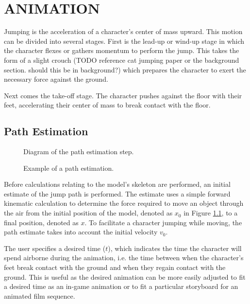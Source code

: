  
\chapter{ANIMATION}
\label{chapter:animation}

Jumping is the acceleration of a character's center of mass upward.  This motion can be divided into several stages.  First is the lead-up or wind-up stage in which the character flexes or gathers momentum to perform the jump.  This takes the form of a slight crouch (TODO reference cat jumping paper or the background section.  should this be in background?) which prepares the character to exert the necessary force against the ground.  

Next comes the take-off stage.  The character pushes against the floor with their feet, accelerating their center of mass to break contact with the floor.  

\section{Path Estimation}

\begin{figure}[ht]
	\centering
	
	\caption[Diagram of path estimation algorithm]{Diagram of the path estimation step.}
	\label{fig:pathEstimate}
\end{figure}

\begin{figure}[ht]
	\label{fig:pathExample}
	\caption[Example of estimated path]{Example of a path estimation.}
\end{figure}
Before calculations relating to the model's skeleton are performed, an initial estimate of the jump path is performed.  The estimate uses a simple forward kinematic calculation to determine the force required to move an object through the air from the initial position of the model, denoted as $x_0$ in Figure \ref{fig:pathEstimate}, to a final position, denoted as $x$.  To facilitate a character jumping while moving, the path estimate takes into account the initial velocity $v_0$.

The user specifies a desired time ($t$), which indicates the time the character will spend airborne during the animation, i.e. the time between when the character's feet break contact with the ground and when they regain contact with the ground.  This is useful as the desired animation can be more easily adjusted to fit a desired time as an in-game animation or to fit a particular storyboard for an animated film sequence.

